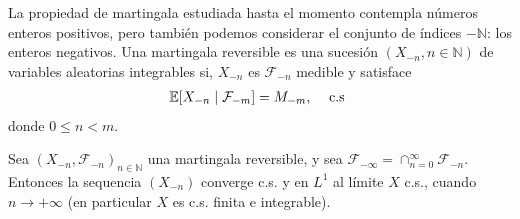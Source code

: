 La propiedad de martingala estudiada hasta el momento contempla números enteros positivos, pero también podemos considerar el conjunto de índices $-\mathbb{N}$: los enteros negativos. Una martingala reversible es una sucesión $(X_{-n}, n \in \mathbb{N})$ de variables aleatorias integrables si, $X_{-n}$ es $\mathcal{F}_{-n}$ medible y satisface
	\begin{align}
	\mathbb{E}[X_{-n} \mid \mathcal{F}_{-m}] = M_{-m}, \hspace{0.3cm} \text{ c.s } \label{aav}
	\end{align}
donde $0 \leq n < m$.

\begin{theorem}
\label{conver2}
Sea $(X_{-n}, \mathcal{F}_{-n})_{n \in \mathbb{N}}$ una martingala reversible, y sea $\mathcal{F}_{-\infty} = \cap_{n = 0}^{\infty} \mathcal{F}_{-n}$. Entonces la sequencia $(X_{-n})$ converge c.s. y en $L^1$ al límite $X$ c.s., cuando $n \rightarrow +\infty$ (en particular $X$ es c.s. finita e integrable).
\end{theorem}
